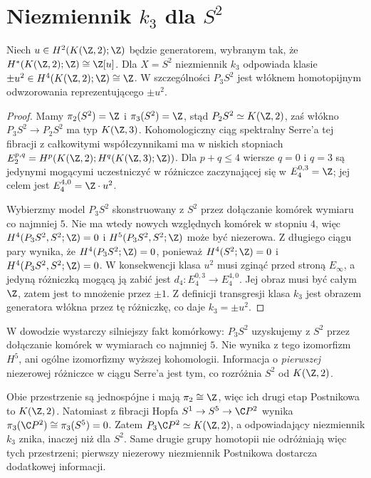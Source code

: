 \section{Niezmiennik \texorpdfstring{$k_3$}{k3} dla \texorpdfstring{$S^2$}{S2}}
\begin{twierdzenie}
\label{thm:s2-k-v7}
Niech $u\in H^2(K(\Z,2);\Z)$ będzie generatorem,
wybranym tak, że $H^*(K(\Z,2);\Z)\cong\Z[u]$.
Dla $X=S^2$ niezmiennik $k_3$ odpowiada klasie
$\pm u^2\in H^4(K(\Z,2);\Z)\cong\Z$.
W szczególności $P_3S^2$ jest włóknem homotopijnym
odwzorowania reprezentującego $\pm u^2$.
\end{twierdzenie}
\begin{proof}
Mamy $\pi_2(S^2)=\Z$ i $\pi_3(S^2)=\Z$,
stąd $P_2S^2\simeq K(\Z,2)$, zaś włókno
$P_3S^2\to P_2S^2$ ma typ $K(\Z,3)$.
Kohomologiczny ciąg spektralny Serre'a tej fibracji
z całkowitymi współczynnikami ma w niskich stopniach
$E_2^{p,q}=H^p(K(\Z,2);H^q(K(\Z,3);\Z))$.
Dla $p+q\le4$ wiersze $q=0$ i $q=3$
są jedynymi mogącymi uczestniczyć w różniczce
zaczynającej się w $E_4^{0,3}=\Z$;
jej celem jest $E_4^{4,0}=\Z\cdot u^2$.

Wybierzmy model $P_3S^2$ skonstruowany z $S^2$
przez dołączanie komórek wymiaru co najmniej $5$.
Nie ma wtedy nowych względnych komórek w stopniu $4$,
więc
$H^4(P_3S^2,S^2;\Z)=0$ i
$H^5(P_3S^2,S^2;\Z)$ może być niezerowa.
Z długiego ciągu pary wynika, że
$H^4(P_3S^2;\Z)=0$, ponieważ
$H^4(S^2;\Z)=0$ i $H^4(P_3S^2,S^2;\Z)=0$.
W konsekwencji klasa $u^2$ musi zginąć przed
stroną $E_\infty$, a jedyną różniczką mogącą
ją zabić jest $d_4:E_4^{0,3}\to E_4^{4,0}$.
Jej obraz musi być całym $\Z$, zatem jest to
mnożenie przez $\pm1$. Z definicji transgresji
klasa $k_3$ jest obrazem generatora włókna
przez tę różniczkę, co daje $k_3=\pm u^2$.
\end{proof}

\begin{uwaga}
W dowodzie wystarczy silniejszy fakt komórkowy:
$P_3S^2$ uzyskujemy z $S^2$ przez dołączanie komórek
w wymiarach co najmniej $5$. Nie wynika z tego
izomorfizm $H^5$, ani ogólne izomorfizmy wyższej
kohomologii. Informacja o \emph{pierwszej} niezerowej
różniczce w ciągu Serre'a jest tym, co rozróżnia
$S^2$ od $K(\Z,2)$.
\end{uwaga}


\begin{przyklad}
Obie przestrzenie są jednospójne i mają
$\pi_2\cong\Z$, więc ich drugi etap Postnikowa
to $K(\Z,2)$. Natomiast z fibracji Hopfa
$S^1\to S^5\to\C P^2$ wynika
$\pi_3(\C P^2)\cong\pi_3(S^5)=0$.
Zatem $P_3\C P^2\simeq K(\Z,2)$, a odpowiadający
niezmiennik $k_3$ znika, inaczej niż dla $S^2$.
Same drugie grupy homotopii nie odróżniają więc tych
przestrzeni; pierwszy niezerowy niezmiennik Postnikowa
dostarcza dodatkowej informacji.
\end{przyklad}

